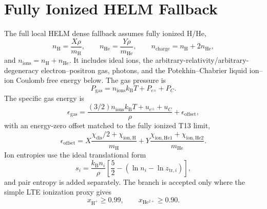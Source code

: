 \documentclass[11pt]{article}
\newcommand{\kb}{k_{\mathrm B}}
\newcommand{\mh}{m_{\mathrm H}}
\newcommand{\mhe}{m_{\mathrm{He}}}
\newcommand{\eps}{\epsilon}
\begin{document}
\section{Fully Ionized HELM Fallback}

The full local HELM dense fallback assumes fully ionized H/He,
\begin{equation}
  n_{\mathrm H}=\frac{X\rho}{\mh},\qquad
  n_{\mathrm{He}}=\frac{Y\rho}{\mhe},\qquad
  n_{\mathrm{charge}}=n_{\mathrm H}+2n_{\mathrm{He}},
\end{equation}
and $n_{\mathrm{ions}}=n_{\mathrm H}+n_{\mathrm{He}}$.  It includes ideal
ions, the arbitrary-relativity/arbitrary-degeneracy electron--positron gas,
photons, and the Potekhin--Chabrier liquid ion--ion Coulomb free energy below.
The gas pressure is
\begin{equation}
  P_{\mathrm{gas}}=n_{\mathrm{ions}}\kb T+P_{e^\pm}+P_C.
\end{equation}
The specific gas energy is
\begin{equation}
  \eps_{\mathrm{gas}} =
  \frac{(3/2)n_{\mathrm{ions}}\kb T+u_{e^\pm}+u_C}{\rho}
  + \eps_{\mathrm{offset}},
\end{equation}
with an energy-zero offset matched to the fully ionized T13 limit,
\begin{equation}
  \eps_{\mathrm{offset}} =
  X\frac{\chi_{\mathrm{dis}}/2+\chi_{\mathrm{ion,H}}}{\mh}
  +Y\frac{\chi_{\mathrm{ion,He1}}+\chi_{\mathrm{ion,He2}}}{\mhe}.
\end{equation}
Ion entropies use the ideal translational form
\begin{equation}
  s_i=\frac{\kb n_i}{\rho}
  \left[\frac{5}{2}-\left(\ln n_i-\ln z_{\mathrm{tr},i}\right)\right],
\end{equation}
and pair entropy is added separately.  The branch is accepted only where the
simple LTE ionization proxy gives
\begin{equation}
  x_{\mathrm{H^+}}\ge 0.99,\qquad x_{\mathrm{He^{2+}}}\ge 0.90.
\end{equation}
\end{document}
